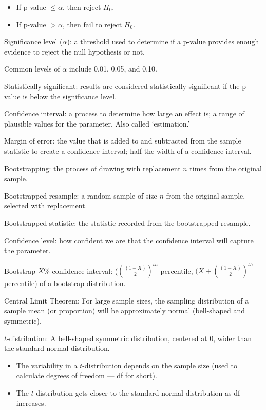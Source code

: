 \documentclass[
]{report}
\providecommand{\tightlist}{%
  \setlength{\itemsep}{0pt}\setlength{\parskip}{0pt}}
\newcommand{\rgi}{\hspace{24pt}}  %
\begin{document}
\begin{itemize}
\item
  If p-value \(\leq \alpha\), then reject \(H_0\).
\item
  If p-value \(> \alpha\), then fail to reject \(H_0\).
\end{itemize}

Significance level (\(\alpha\)): a threshold used to determine if a p-value provides enough evidence to reject the null hypothesis or not.

\rgi Common levels of \(\alpha\) include 0.01, 0.05, and 0.10.

Statistically significant: results are considered statistically significant if the p-value is below the significance level.

Confidence interval: a process to determine how large an effect is; a range of plausible values for the parameter. Also called `estimation.'

Margin of error: the value that is added to and subtracted from the sample statistic to create a confidence interval; half the width of a confidence interval.

Bootstrapping: the process of drawing with replacement \(n\) times from the original sample.

Bootstrapped resample: a random sample of size \(n\) from the original sample, selected with replacement.

Bootstrapped statistic: the statistic recorded from the bootstrapped resample.

Confidence level: how confident we are that the confidence interval will capture the parameter.

Bootstrap \(X\)\% confidence interval: (\((\frac{(1-X)}{2})^{th}\) percentile, \((X+(\frac{(1-X)}{2})^{th}\) percentile) of a bootstrap distribution.

Central Limit Theorem: For large sample sizes, the sampling distribution of a sample mean (or proportion) will be approximately normal (bell-shaped and symmetric).

\(t\)-distribution: A bell-shaped symmetric distribution, centered at 0, wider than the standard normal distribution.

\begin{itemize}
\tightlist
\item
  The variability in a \(t\)-distribution depends on the sample size (used to calculate degrees of freedom --- df for short).
\item
  The \(t\)-distribution gets closer to the standard normal distribution as df increases.
\end{itemize}
\end{document}
